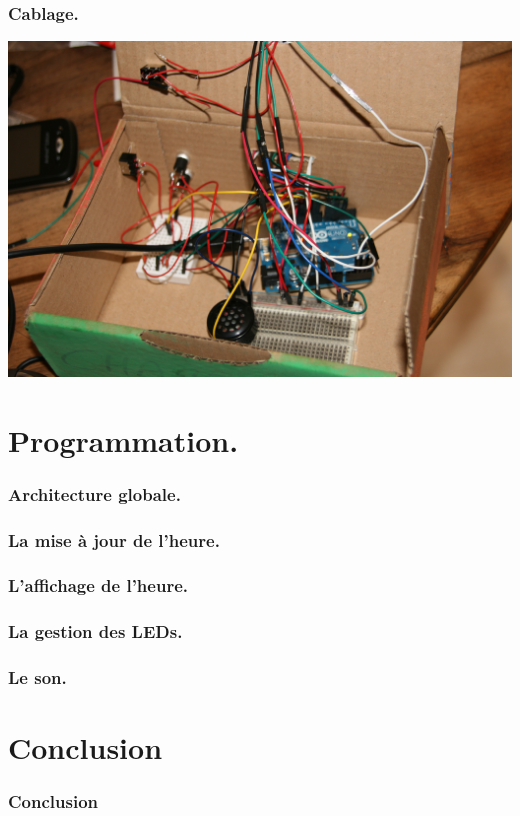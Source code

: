 \documentclass{beamer}
\begin{document}
\begin{frame}
	\frametitle{Cablage.}
	\begin{center}
		\includegraphics[scale=0.07]{rc/cablage.jpg}
	\end{center}
\end{frame}

\section{Programmation.}

\begin{frame}
	\frametitle{Architecture globale.}
\end{frame}

\begin{frame}
	\frametitle{La mise à jour de l'heure.}
\end{frame}

\begin{frame}
	\frametitle{L'affichage de l'heure.}
\end{frame}

\begin{frame}
	\frametitle{La gestion des LEDs.}
\end{frame}

\begin{frame}
	\frametitle{Le son.}
\end{frame}

\section{Conclusion}

\begin{frame}
	\frametitle{Conclusion}
\end{frame}
\end{document}
